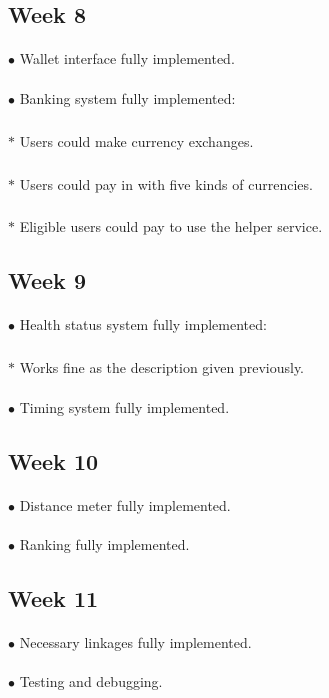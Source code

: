 \documentclass[paper=a4, fontsize=11pt]{scrartcl} %
\begin{document}
\subsection{Week 8}
\paragraph{}$\bullet$ Wallet interface fully implemented.
\paragraph{}$\bullet$ Banking system fully implemented:
\subparagraph{}\quad $\ast$ Users could make currency exchanges.
\subparagraph{}\quad $\ast$ Users could pay in with five kinds of currencies.
\subparagraph{}\quad $\ast$ Eligible users could pay to use the helper service.
\subsection{Week 9}
\paragraph{}$\bullet$ Health status system fully implemented:
\subparagraph{}\quad $\ast$ Works fine as the description given previously.
\paragraph{}$\bullet$ Timing system fully implemented.
\subsection{Week 10}
\paragraph{}$\bullet$ Distance meter fully implemented.
\paragraph{}$\bullet$ Ranking fully implemented.
\subsection{Week 11}
\paragraph{}$\bullet$ Necessary linkages fully implemented.
\paragraph{}$\bullet$ Testing and debugging.
\end{document}
